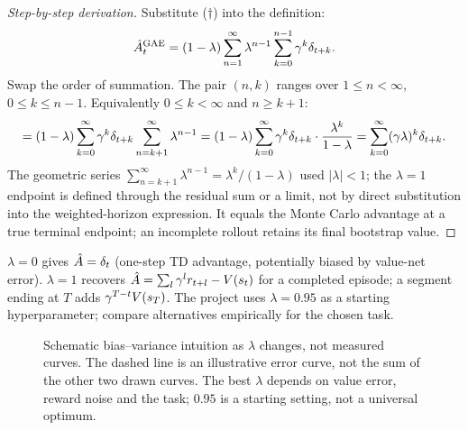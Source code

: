 \documentclass[11pt,oneside]{scrbook}
\begin{document}
\begin{proof}[Step-by-step derivation]
Substitute ($\dag$) into the definition:
\[
  \hat {A}_t^{\mathrm{GAE}} = (1-\lambda)\sum_{n=1}^\infty \lambda^{n-1} \sum_{k=0}^{n-1} \gamma^k \delta_{t+k}.
\]
Swap the order of summation. The pair $(n,k)$ ranges over $1 \le n < \infty$, $0 \le k \le n-1$. Equivalently $0 \le k < \infty$ and $n \ge k+1$:
\[
  = (1-\lambda) \sum_{k=0}^\infty \gamma^k \delta_{t+k} \sum_{n=k+1}^\infty \lambda^{n-1}
  = (1-\lambda) \sum_{k=0}^\infty \gamma^k \delta_{t+k} \cdot \frac{\lambda^{k}}{1-\lambda}
  = \sum_{k=0}^\infty (\gamma\lambda)^k \delta_{t+k}.
\]
The geometric series $\sum_{n=k+1}^\infty \lambda^{n-1} = \lambda^k / (1-\lambda)$ used $|\lambda|<1$; the $\lambda=1$ endpoint is defined through the residual sum or a
limit, not by direct substitution into the weighted-horizon expression.
It equals the Monte Carlo advantage at a true terminal endpoint; an
incomplete rollout retains its final bootstrap value.
\end{proof}

\begin{remark}
$\lambda=0$ gives $\hat{A} = \delta_t$ (one-step TD advantage, potentially biased by value-net error). $\lambda=1$ recovers $\hat{A}=\sum_l\gamma^lr_{t+l}-V(s_t)$
for a completed episode; a segment ending at $T$ adds
$\gamma^{T-t}V(s_T)$. The project uses $\lambda=0.95$ as a starting
hyperparameter; compare alternatives empirically for the chosen task.
\end{remark}

\begin{figure}[h]
\centering
{}
\caption{Schematic bias--variance intuition as $\lambda$ changes, not measured curves. The dashed line is an illustrative error curve, not the sum of the other two drawn curves. The best $\lambda$ depends on value error, reward noise and the task; $0.95$ is a starting setting, not a universal optimum.}
\end{figure}
\end{document}
